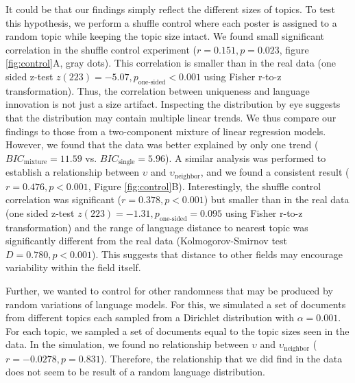 \documentclass[10pt,letterpaper]{article}
\begin{document}
It could be that our findings simply reflect the different sizes of topics. To test this hypothesis, we perform a shuffle control where each poster is assigned to a random topic while keeping the topic size intact. We found small significant correlation in the shuffle control experiment ($r = 0.151, p = 0.023$, figure \ref{fig:control}A, gray dots). This correlation is smaller than in the real data (one sided z-test $z(223) = -5.07, p_\text{one-sided} < 0.001 $ using Fisher r-to-z transformation). Thus, the correlation between uniqueness and language innovation is not just a size artifact. Inspecting the distribution by eye suggests that the distribution may contain multiple linear trends. We thus compare our findings to those from a two-component mixture of linear regression models. However, we found that the data was better explained by only one trend ($BIC_{\text{mixture}} = 11.59$ vs. $BIC_{\text{single}} = 5.96$). A similar analysis was performed to establish a relationship between $\upsilon$ and $\upsilon_{\text{neighbor}}$, and we found a consistent result ($r = 0.476, p < 0.001$, Figure \ref{fig:control}B). Interestingly, the shuffle control correlation was significant ($r = 0.378, p < 0.001$) but smaller than in the real data (one sided z-test $z(223) = -1.31, p_\text{one-sided} = 0.095$ using Fisher r-to-z transformation) and the range of language distance to nearest topic was significantly different from the real data (Kolmogorov-Smirnov test $D = 0.780, p < 0.001$). This suggests that distance to other fields may encourage variability within the field itself.

Further, we wanted to control for other randomness that may be produced by random variations of language models. For this, we simulated a set of documents from different topics each sampled from a Dirichlet distribution with $\alpha=0.001$. For each topic, we sampled a set of documents equal to the topic sizes seen in the data. In the simulation, we found no relationship between $\upsilon$ and $\upsilon_{\text{neighbor}}$ ($r = -0.0278, p = 0.831$). Therefore, the relationship that we did find in the data does not seem to be result of a random language distribution.
\end{document}
